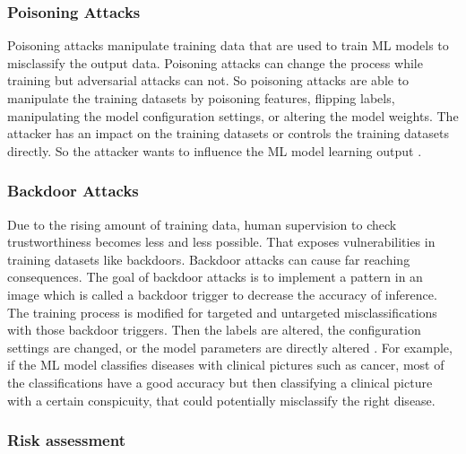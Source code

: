 \subsubsection*{Poisoning Attacks}

Poisoning attacks manipulate training data that are used to train ML models to misclassify the output data. Poisoning attacks can change the process while training but adversarial attacks can not. So poisoning attacks are able to manipulate the training datasets by poisoning features, flipping labels, manipulating the model configuration settings, or altering the model weights. The attacker has an impact on the training datasets or controls the training datasets directly. So the attacker wants to influence the ML model learning output \cite{DBLP:journals/corr/abs-2112-02797}.

\subsubsection*{Backdoor Attacks}
\label{sec:backdoor}

Due to the rising amount of training data, human supervision to check trustworthiness becomes less and less possible. That exposes vulnerabilities in training datasets like backdoors. Backdoor attacks
can cause far reaching consequences. The goal of backdoor attacks is to implement a pattern in an image which is called a backdoor trigger \cite{DBLP:journals/corr/abs-1708-06733} to decrease the accuracy of inference. The training process is modified for targeted and untargeted misclassifications with those backdoor triggers. Then the labels are altered, the configuration settings are changed, or the model parameters are directly altered \cite{DBLP:journals/corr/abs-2112-02797}. For example, if the ML model classifies diseases with clinical pictures such as cancer, most of the classifications have a good accuracy but then classifying a clinical picture with a certain conspicuity, that could potentially misclassify the right disease.

\subsubsection*{Risk assessment}

